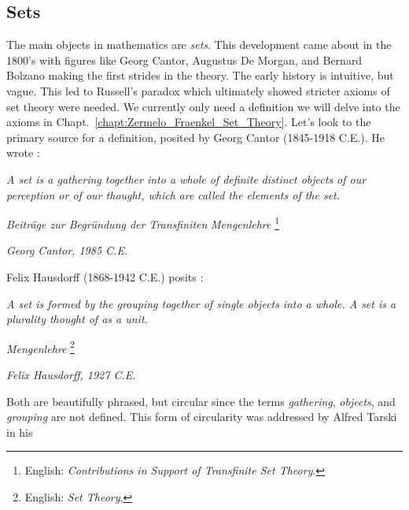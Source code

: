     \subsection{Sets}
        The main objects in mathematics are \textit{sets}. This development came
        about in the 1800's with figures like Georg Cantor,
        Augustus De Morgan, and Bernard
        Bolzano making the first strides in the theory.
        The early history is intuitive, but vague. This led to Russell's
        paradox which
        ultimately showed stricter axioms of set theory were needed. We
        currently only need a definition we will delve into the axioms in
        Chapt.~\ref{chapt:Zermelo_Fraenkel_Set_Theory}. Let's look to the
        primary source for a definition, posited by Georg Cantor
        (1845-1918 C.E.). He wrote \cite{Cantor1895}:
        \begin{center}
            \textit{A set is a gathering together into a whole of definite}
            \textit{distinct objects of our perception or of our thought, which}
            \textit{are called the elements of the set.}
            \par\hfill
            \textit{Beitr\"{a}ge zur Begr\"{u}ndung der Transfiniten}
            \textit{Mengenlehre}%
            \footnote{%
                English:
                \textit{Contributions in Support of Transfinite Set Theory}.%
            }
            \par\hfill
            \textit{Georg Cantor, 1985 C.E.}
        \end{center}
        Felix Hausdorff (1868-1942 C.E.) posits
        \cite[p.~11]{HausdorffSetTheory}:
        \begin{center}
            \textit{A set is formed by the grouping together of single objects}
            \textit{into a whole. A set is a plurality thought of as a unit.}
            \par\hfill
            \textit{Mengenlehre}%
            \footnote{%
                English:
                \textit{Set Theory}.%
            }
            \par\hfill
            \textit{Felix Hausdorff, 1927 C.E.}
        \end{center}
        Both are beautifully phrased, but circular since the terms
        \textit{gathering}, \textit{objects}, and \textit{grouping} are not
        defined. This form of circularity was addressed by Alfred Tarski in his
